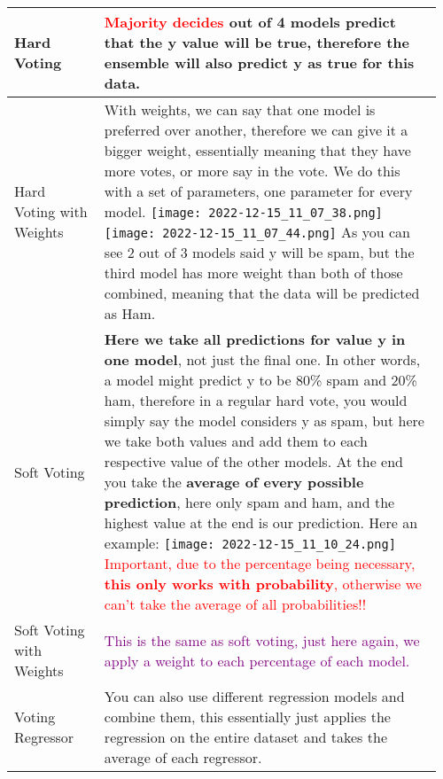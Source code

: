 \documentclass[main.tex,fontsize=8pt,paper=a4,paper=portrait,DIV=calc,]{scrartcl}
\begin{document}
\begin{table}[ht!]
\section{}
\begin{tabular}{|m{0.2\linewidth}|m{0.755\linewidth}|}
\hline
Hard Voting & 
\textcolor{red}{Majority decides}\newline
3 out of 4 models predict that the y value will be true, therefore the ensemble will also predict y as true for this data.
\\
\hline
Hard Voting with Weights & 
With weights, we can say that one model is preferred over another, therefore we can give it a bigger weight, essentially meaning that they have more votes, or more say in the vote.\newline
We do this with a set of parameters, one parameter for every model.\newline
\texttt{[image: 2022-12-15\_11\_07\_38.png]}\texttt{[image: 2022-12-15\_11\_07\_44.png]}\newline
As you can see 2 out of 3 models said y will be spam, but the third model has more weight than both of those combined, meaning that the data will be predicted as Ham.\\
\hline
Soft Voting & 
\textbf{Here we take all predictions for value y in one model}, not just the final one.\newline
In other words, a model might predict y to be 80\% spam and 20\% ham, therefore in a regular hard vote, you would simply say the model considers y as spam, but here we take both values and add them to each respective value of the other models.\newline
At the end you take the \textbf{average of every possible prediction}, here only spam and ham, and the highest value at the end is our prediction.\newline
Here an example: \newline
\texttt{[image: 2022-12-15\_11\_10\_24.png]} \newline
\textcolor{red}{Important, due to the percentage being necessary, \textbf{this only works with probability}, otherwise we can't take the average of all probabilities!!}\\
\hline
Soft Voting with Weights & 
\textcolor{purple}{This is the same as soft voting, just here again, we apply a weight to each percentage of each model.}
\\
\hline
Voting Regressor & 
You can also use different regression models and combine them, this essentially just applies the regression on the entire dataset and takes the average of each regressor.

\end{tabular}
\end{table}
\end{document}
